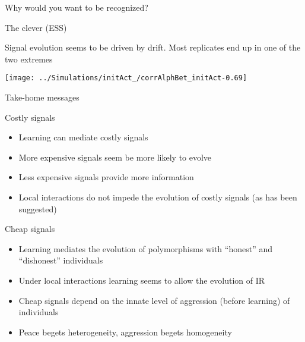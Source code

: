 \documentclass[
  ignorenonframetext,
]{beamer}
\providecommand{\tightlist}{%
  \setlength{\itemsep}{0pt}\setlength{\parskip}{0pt}}
\begin{document}
\begin{frame}{Why would you want to be recognized?}
\protect\hypertarget{why-would-you-want-to-be-recognized-10}{}

\begin{block}{The clever (ESS)}

Signal evolution seems to be driven by drift. Most replicates end up in
one of the two extremes

\begin{flushleft}\texttt{[image: ../Simulations/initAct\_/corrAlphBet\_initAct-0.69]} \end{flushleft}

\end{block}

\end{frame}

\begin{frame}{Take-home messages}
\protect\hypertarget{take-home-messages}{}

\begin{block}{Costly signals}

\begin{itemize}
\tightlist
\item
  Learning can mediate costly signals
\item
  More expensive signals seem be more likely to evolve
\item
  Less expensive signals provide more information
\item
  Local interactions do not impede the evolution of costly signals (as
  has been suggested)
\end{itemize}

\end{block}

\begin{block}{Cheap signals}

\begin{itemize}
\tightlist
\item
  Learning mediates the evolution of polymorphisms with ``honest'' and
  ``dishonest'' individuals
\item
  Under local interactions learning seems to allow the evolution of IR
\item
  Cheap signals depend on the innate level of aggression (before
  learning) of individuals
\item
  Peace begets heterogeneity, aggression begets homogeneity
\end{itemize}

\end{block}

\end{frame}
\end{document}
